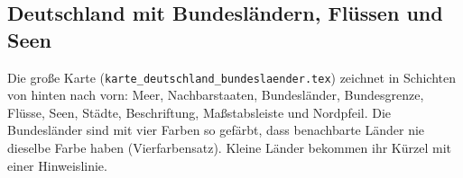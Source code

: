 \begin{ausgabe}

\centering
\begin{passend}%
%
\end{passend}
\end{ausgabe}



\subsection{Deutschland mit Bundesländern, Flüssen und Seen}

Die große Karte (\texttt{karte\_deutschland\_bundeslaender.tex}) zeichnet in Schichten von hinten nach vorn: Meer, Nachbarstaaten, Bundesländer, Bundesgrenze, Flüsse, Seen, Städte, Beschriftung, Maßstabsleiste und Nordpfeil. Die Bundesländer sind mit vier Farben so gefärbt, dass benachbarte Länder nie dieselbe Farbe haben (Vierfarbensatz). Kleine Länder bekommen ihr Kürzel mit einer Hinweislinie.

